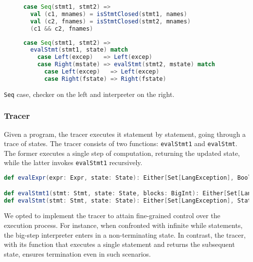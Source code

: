 \begin{figure}[H]
  \begin{minipage}{0.48\textwidth}
    \centering
    \begin{lstlisting}[language=Scala,frame=none,escapechar=*,basicstyle=\tt\scriptsize]
case Seq(stmt1, stmt2) =>
  val (c1, mnames) = isStmtClosed(stmt1, names)
  val (c2, fnames) = isStmtClosed(stmt2, mnames)
  (c1 && c2, fnames)
\end{lstlisting}
  \end{minipage}%
  \centering
  \begin{minipage}{0.52\textwidth}
    \centering
    \begin{lstlisting}[language=Scala,frame=none,escapechar=*,basicstyle=\tt\scriptsize]
case Seq(stmt1, stmt2) =>          
  evalStmt(stmt1, state) match
    case Left(excep)   => Left(excep) 
    case Right(mstate) => evalStmt(stmt2, mstate) match
      case Left(excep)   => Left(excep) 
      case Right(fstate) => Right(fstate)
\end{lstlisting}
  \end{minipage}
\end{figure}


\begin{center}
  \texttt{Seq} case, checker on the left and interpreter on the right.
\end{center}

\subsubsection{Tracer}

Given a program, the tracer executes it statement by statement, going through a trace of states. The tracer consists of two functions: \texttt{evalStmt1} and \texttt{evalStmt}. The former executes a single step of computation, returning the updated state, while the latter invokes \texttt{evalStmt1} recursively.

\begin{lstlisting}[language=Scala,frame=none,escapechar=*,basicstyle=\tt\scriptsize]
def evalExpr(expr: Expr, state: State): Either[Set[LangException], Boolean]

def evalStmt1(stmt: Stmt, state: State, blocks: BigInt): Either[Set[LangException], Conf]
def evalStmt(stmt: Stmt, state: State): Either[Set[LangException], State]
\end{lstlisting}

We opted to implement the tracer to attain fine-grained control over the execution process. For instance, when confronted with infinite while statements, the big-step interpreter enters in a non-terminating state. In contrast, the tracer, with its function that executes a single statement and returns the subsequent state, ensures termination even in such scenarios.


